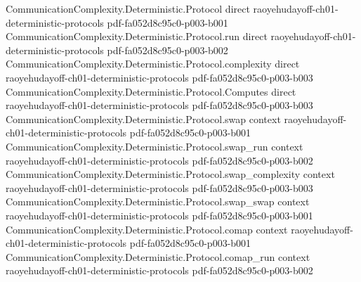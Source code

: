 \begin{theorem}
\label{CommunicationComplexity.Deterministic.foolingSet_ncard_le_pow_of_communicationComplexity_le}
\leanok
{}
\proofstep
  {CommunicationComplexity.Deterministic.Protocol}
  {direct}
  {raoyehudayoff-ch01-deterministic-protocols}
  {pdf-fa052d8c95c0-p003-b001}
\proofstep
  {CommunicationComplexity.Deterministic.Protocol.run}
  {direct}
  {raoyehudayoff-ch01-deterministic-protocols}
  {pdf-fa052d8c95c0-p003-b002}
\proofstep
  {CommunicationComplexity.Deterministic.Protocol.complexity}
  {direct}
  {raoyehudayoff-ch01-deterministic-protocols}
  {pdf-fa052d8c95c0-p003-b003}
\proofstep
  {CommunicationComplexity.Deterministic.Protocol.Computes}
  {direct}
  {raoyehudayoff-ch01-deterministic-protocols}
  {pdf-fa052d8c95c0-p003-b003}
\proofstep
  {CommunicationComplexity.Deterministic.Protocol.swap}
  {context}
  {raoyehudayoff-ch01-deterministic-protocols}
  {pdf-fa052d8c95c0-p003-b001}
\proofstep
  {CommunicationComplexity.Deterministic.Protocol.swap_run}
  {context}
  {raoyehudayoff-ch01-deterministic-protocols}
  {pdf-fa052d8c95c0-p003-b002}
\proofstep
  {CommunicationComplexity.Deterministic.Protocol.swap_complexity}
  {context}
  {raoyehudayoff-ch01-deterministic-protocols}
  {pdf-fa052d8c95c0-p003-b003}
\proofstep
  {CommunicationComplexity.Deterministic.Protocol.swap_swap}
  {context}
  {raoyehudayoff-ch01-deterministic-protocols}
  {pdf-fa052d8c95c0-p003-b001}
\proofstep
  {CommunicationComplexity.Deterministic.Protocol.comap}
  {context}
  {raoyehudayoff-ch01-deterministic-protocols}
  {pdf-fa052d8c95c0-p003-b001}
\proofstep
  {CommunicationComplexity.Deterministic.Protocol.comap_run}
  {context}
  {raoyehudayoff-ch01-deterministic-protocols}
  {pdf-fa052d8c95c0-p003-b002}

\end{theorem}
